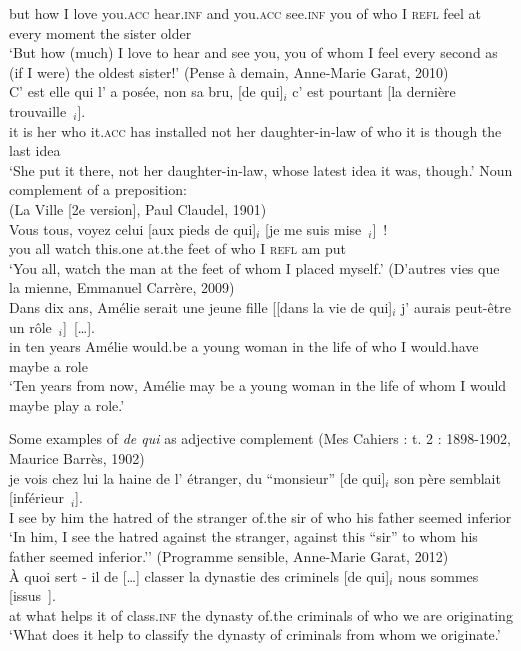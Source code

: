 but how I love you\textsc{.acc} hear\textsc{.inf} and you\textsc{.acc} see\textsc{.inf} you of who I \textsc{refl} feel at every moment the sister older\\
\glt `But how (much) I love to hear and see you, you of whom I feel every second as (if I were) the oldest sister!'
\ex (Pense à demain, Anne-Marie Garat, 2010)\\
\gll C' est elle qui l' a posée, non sa bru, [de qui]$_i$ c' est pourtant [la dernière trouvaille~\trace{}$_i$].\\
it is her who it\textsc{.acc} has installed not her daughter-in-law of who it is though the last idea\\
\glt `She put it there, not her daughter-in-law, whose latest idea it was, though.'
\ex Noun complement of a preposition:\\
(La Ville [2e version], Paul Claudel, 1901)\\
\gll Vous tous, voyez celui [aux pieds de qui]$_i$ [je me suis mise~\trace{}$_i$]~!\\
you all watch this.one at.the feet of who I \textsc{refl} am put\\
\glt `You all, watch the man at the feet of whom I placed myself.'
\ex (D'autres vies que la mienne, Emmanuel Carrère, 2009)\\
\gll Dans dix ans, Amélie serait une jeune fille [[dans la vie de qui]$_i$ j' aurais peut-être un rôle~\trace{}$_i$]~[\dots]. \\
in ten years Amélie would.be a young woman in the life of who I would.have maybe a role\\
\glt `Ten years from now, Amélie may be a young woman in the life of whom I would maybe play a role.'
\z

\ex Some examples of \emph{de qui} as adjective complement\label{ex:dq2000-adjective}
\ea (Mes Cahiers : t. 2 : 1898-1902, Maurice Barrès, 1902)\\
\gll [\dots] je vois chez lui la haine de l' étranger, du ``monsieur'' [de qui]$_i$ son père semblait [inférieur~\trace{}$_i$].\\
{} I see by him the hatred of the stranger of.the sir of who his father seemed inferior\\
\glt `In him, I see the hatred against the stranger, against this ``sir'' to whom his father seemed inferior.''
\ex (Programme sensible, Anne-Marie Garat, 2012)\\
\gll À quoi sert - il de [\dots] classer la dynastie des criminels [de qui]$_i$ nous sommes [issus~\trace{}].\\
at what helps {} it of {} class\textsc{.inf} the dynasty of.the criminals of who we are originating\\
\glt `What does it help to classify the dynasty of criminals from whom we originate.'
\z 

